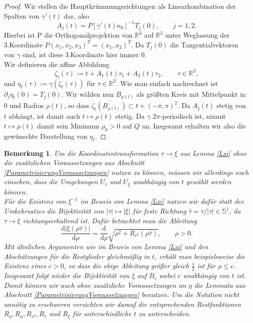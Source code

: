 \documentclass[12pt,a4paper]{scrartcl}
\newtheorem{Bemerkung}[Satz]{Bemerkung}
\newcommand{\dd}{\mathrm{d}}
\numberwithin{equation}{section}
\newcommand{\R}{\mathbb{R}} %
\begin{document}
\begin{proof}
Wir stellen die Hauptkrümmungsrichtungen als Linearkombination der Spalten von $\gamma'(t)$ dar, also
\[
A_j(t) = P[\gamma'(t) n_0]^{-1} T_j(0), \qquad j=1,2.
\]
Hierbei ist P die Orthogonalprojektion von $\R^3$ auf $\R^2$ unter Weglassung der 3.Koordinate  $P(x_1,x_2,x_3)^T = (x_1,x_2)^T$. Da $T_j(0)$ die Tangentialvektoren von $\gamma$ sind, ist diese 3.Koordinate hier immer 0. \\
Wir definieren die affine Abbildung 
\[
\zeta_t(\tau):=t+A_1(t)\tau_1 +A_2(t)\tau_2, \qquad \tau \in \R^2,
\]
und $\eta_t(\tau):=\gamma(\zeta_t(\tau))$ für $\tau \in \R^2$. Wie man einfach nachrechnet ist $\partial_j \eta_t (0) =T_j(0)$. Wir wählen nun $B_{\rho(t)}$ als größten Kreis mit Mittelpunkt in $0$ und Radius $\rho (t)$, so dass $\overline{\zeta_{t}(B_{\rho(t)})} \subset t + (-\pi,\pi)^2$. Da $A_j(t)$ stetig von $t$ abhängt, ist damit auch $t \mapsto \rho(t)$ stetig. Da $\gamma$ $2\pi$-periodisch ist, nimmt $t \mapsto \rho(t)$ damit sein Minimum $\rho_0>0$ auf $Q$ an. Insgesamt erhalten wir also die gewünschte Darstellung von $\eta_t$. 
\end{proof}
\begin{Bemerkung} \label{Bmindestg}
Um die Koordinatentransformation $\tau \to \xi$ aus Lemma \ref{Lxi} ohne die zusätzlichen Voraussetzungen aus Abschnitt \ref{ParametrisierungVoraussetzungen} nutzen zu können, müssen wir allerdings noch einsehen, dass die Umgebungen $U_{\tau}$ und $U_{\xi}$ unabhängig von $t$ gewählt werden können. \\
Für die Existenz von $\xi^{-1}$ im Beweis von Lemma \ref{Lxi} nutzen wir dafür statt des Umkehrsatzes die Bijektivität von $|\tau| \mapsto |\xi|$ für feste Richtung $\hat{\tau}=\tau/|\tau|\in \mathbb{S}^1$, da $\tau \to \xi$ richtungserhaltend ist. 
Dafür betrachtet man die Ableitung 
\[
\frac{\dd |\xi(\rho \hat{\tau})|}{\dd \rho}= \frac{\dd}{\dd \rho} \sqrt{\rho^2 +R_{r^2}(\rho \hat{\tau})}, \qquad \rho>0.
\]
Mit ähnlichen Argumenten wie im Beweis von Lemma \ref{Lxi} und den Abschätzungen für die Restglieder gleichmäßig in $t$, erhält man beispielsweise die Existenz eines $c>0$, so dass die obige Ableitung größer gleich $\frac{1}{2}$ ist für $ \rho \leq c$. Insgesamt folgt wieder die Bijektivität von $\xi$ auf $B_c$ wobei $c$ unabhängig von $t$ ist.
Damit können wir auch ohne zusätzliche Voraussetzungen an $\eta$ die Lemmata aus Abschnitt \ref{ParametrisierungVoraussetzungen} benutzen. Um die Notation nicht unnötig zu erschweren verzichten wir darauf die entsprechenden Restfunktionen $R_\eta, R_n, R_{r^2}, R_\tau$ und $R_\xi$ für unterschiedliche $t$ zu unterscheiden.
\end{Bemerkung}
\end{document}
